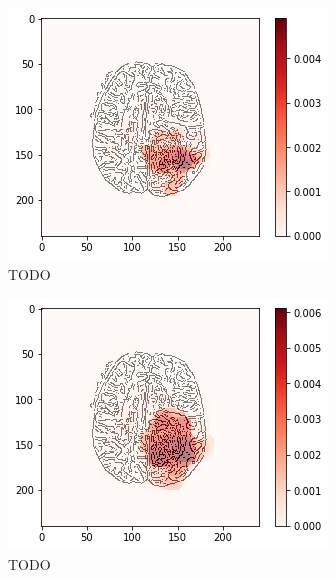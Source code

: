 \begin{figure}[H]
    \centering
    \begin{subfigure}{.33\textwidth}
        \centering
        \includegraphics[width=\linewidth]{chapters/06_hdm/b_Brats18_TCIA08_242_1_L2/33.png}
        \caption{TODO}
    \end{subfigure}%
    \begin{subfigure}{.33\textwidth}
        \centering
        \includegraphics[width=\linewidth]{chapters/06_hdm/circle15/13.png}
        \caption{TODO}
    \end{subfigure}
        \begin{subfigure}{.33\textwidth}

\end{subfigure}
\end{figure}
